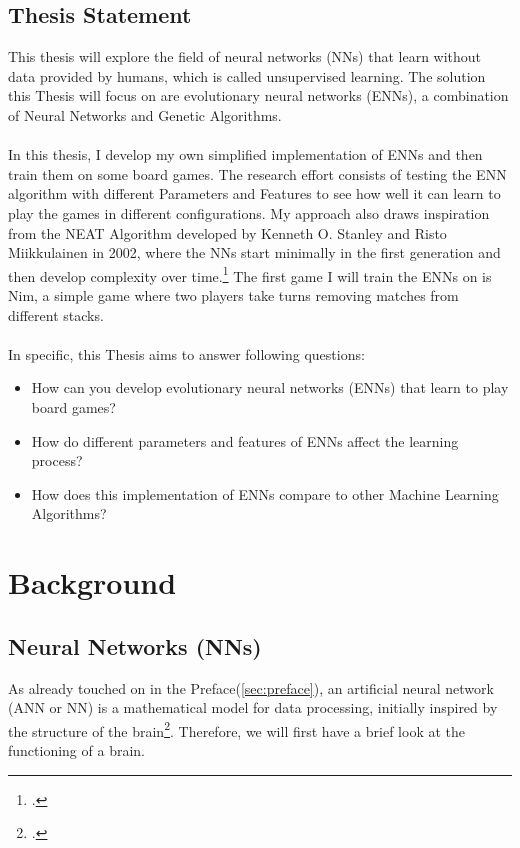 \documentclass[11pt]{report}
\begin{document}
        \section{Thesis Statement}\label{sec:thesis-statement}
    This thesis will explore the field of neural networks (NNs) that learn without data provided by humans, which is called unsupervised learning.
    The solution this Thesis will focus on are evolutionary neural networks (ENNs), a combination of Neural Networks and Genetic Algorithms.
    \\ \\
    In this thesis, I develop my own simplified implementation of ENNs and then train them on some board games.
    The research effort consists of testing the ENN algorithm with different Parameters and Features to see how well it can learn to play the games in different configurations.
    My approach also draws inspiration from the NEAT Algorithm developed by Kenneth O. Stanley and Risto Miikkulainen in 2002, where the NNs start minimally in the first generation and then develop complexity over time.\footcite[p.105-106]{Neat_02}
    The first game I will train the ENNs on is Nim, a simple game where two players take turns removing matches from different stacks.
    \\ \\
    In specific, this Thesis aims to answer following questions:
    \begin{itemize}
        \item How can you develop evolutionary neural networks (ENNs) that learn to play board games?
        \item How do different parameters and features of ENNs affect the learning process?
        \item How does this implementation of ENNs compare to other Machine Learning Algorithms?
    \end{itemize}
    \chapter{Background}\label{ch:background}
    \section{Neural Networks (NNs)}\label{sec:neural-networks-(nns)}
    As already touched on in the Preface(\ref{sec:preface}), an artificial neural network (ANN or NN) is a mathematical model for data processing, initially inspired by the structure of the brain\footcite{Chandra_22}.
    Therefore, we will first have a brief look at the functioning of a brain.
\end{document}

